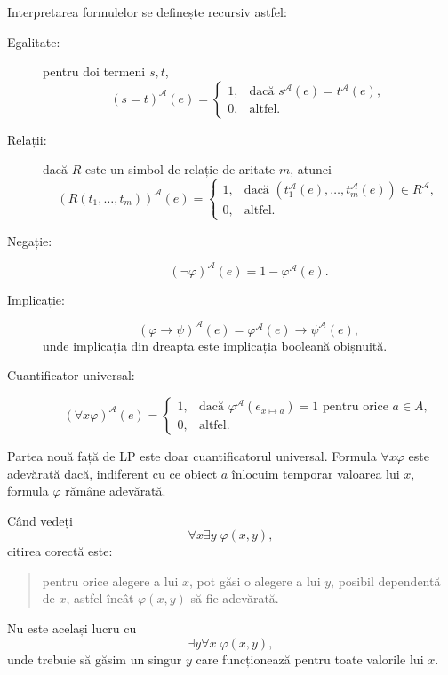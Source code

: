 \begin{definition}
	Interpretarea formulelor se definește recursiv astfel:

	\begin{description}
		\item[Egalitate:] pentru doi termeni \(s,t\),
			\[
				(s=t)^\mathcal{A}(e) =
				\begin{cases}
					1, & \text{dacă } s^\mathcal{A}(e)=t^\mathcal{A}(e), \\
					0, & \text{altfel.}
				\end{cases}
			\]

		\item[Relații:] dacă \(R\) este un simbol de relație de aritate \(m\), atunci
			\[
				(R(t_1,\dots,t_m))^\mathcal{A}(e) =
				\begin{cases}
					1, & \text{dacă } (t_1^\mathcal{A}(e),\dots,t_m^\mathcal{A}(e)) \in R^\mathcal{A}, \\
					0, & \text{altfel.}
				\end{cases}
			\]

		\item[Negație:]
			\[
				(\neg \varphi)^\mathcal{A}(e) = 1 - \varphi^\mathcal{A}(e).
			\]

		\item[Implicație:]
			\[
				(\varphi \to \psi)^\mathcal{A}(e) = \varphi^\mathcal{A}(e) \to \psi^\mathcal{A}(e),
			\]
			unde implicația din dreapta este implicația booleană obișnuită.

		\item[Cuantificator universal:]
			\[
				(\forall x \varphi)^\mathcal{A}(e) =
				\begin{cases}
					1, & \text{dacă } \varphi^\mathcal{A}(e_{x \mapsto a}) = 1 \text{ pentru orice } a \in A, \\
					0, & \text{altfel.}
				\end{cases}
			\]
	\end{description}
\end{definition}

Partea nouă față de LP este doar cuantificatorul universal. Formula \( \forall x \varphi \) este adevărată dacă, indiferent cu ce obiect \(a\) înlocuim temporar valoarea
lui \(x\), formula \( \varphi \) rămâne adevărată.

\begin{note}
	Când vedeți
	\[
		\forall x \exists y \; \varphi(x,y),
	\]
	citirea corectă este:

	\begin{quote}
		pentru orice alegere a lui \(x\), pot găsi o alegere a lui \(y\), posibil dependentă de \(x\), astfel încât \(\varphi(x,y)\) să fie adevărată.
	\end{quote}

	Nu este același lucru cu
	\[
		\exists y \forall x \; \varphi(x,y),
	\]
	unde trebuie să găsim un singur \(y\) care funcționează pentru toate valorile lui \(x\).
\end{note}

